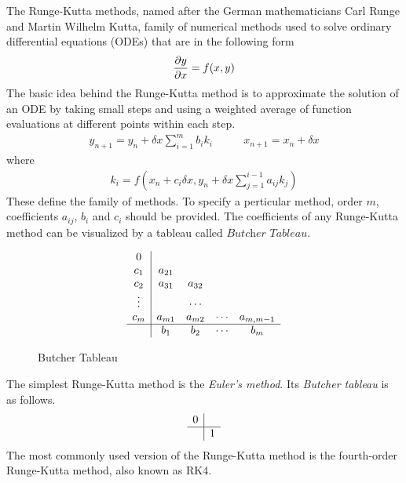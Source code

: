 \documentclass[a4paper,oneside,12pt]{report}
\numberwithin{equation}{chapter}
\begin{document}
The Runge-Kutta methods, named after the German mathematicians Carl Runge and Martin Wilhelm Kutta, family of numerical methods
used to solve ordinary differential equations (ODEs) that are in the following form
\begin{equation} \label{eq:first-order-ODE}
    \frac{\partial y}{\partial x} = f(x, y)
\end{equation}
The basic idea behind the Runge-Kutta method is to approximate the solution of an ODE by taking small steps and using a weighted average 
of function evaluations at different points within each step.
\begin{equation} \label{eq:general-rk}
    \begin{aligned}
        y_{n+1} = y_n + \delta x \sum_{i=1}^{m} b_i k_i
    \end{aligned}
    \qquad
    \begin{aligned}
        x_{n+1} = x_n + \delta x 
    \end{aligned}
\end{equation}
where 
\begin{eqnarray} \label{eq:general-rk-coef}
    k_i = f(x_n + c_i \delta x, y_n + \delta x \sum_{j = 1}^{i - 1}a_{ij}k_j)
\end{eqnarray}
These  define the family of methods. To specify a perticular method, order $m$, coefficients $a_{ij}$, $b_i$ and $c_i$ should be provided.
The coefficients of any Runge-Kutta method can be visualized by a tableau called $\textit{Butcher Tableau}$.
\begin{figure}[h!]
    \[ 
    \begin{array} 
        {c|cccc}
        0\\
        c_1 & a_{21} \\
        c_2 & a_{31} & a_{32}\\
        \vdots& & \cdots& \\
        c_m & a_{m1} & a_{m2} & \cdots & a_{m,m-1}\\
        \hline
        & b_1 & b_2 &\cdots & b_m
    \end{array}
    \]
    \caption{Butcher Tableau}
    \label{fig:Butcher}
\end{figure}
The simplest Runge-Kutta method is the \textit{Euler's method}. Its \textit{Butcher tableau} is as follows.
\[ 
    \begin{array} 
        {c|cccc}
        0\\
        \hline
        & 1
    \end{array}
\]
The most commonly used version of the Runge-Kutta method is the fourth-order Runge-Kutta method, also known as RK4. 
\end{document}
